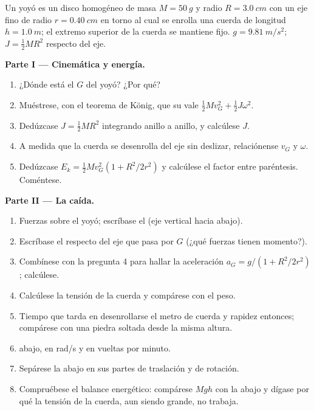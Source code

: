 \begin{problem}
\label{pb:b1:systems-of-points:1}
Un yoyó es un disco homogéneo de masa $M = \qty{50}{g}$ y radio $R =
\qty{3.0}{cm}$ con un eje fino de radio $r = \qty{0.40}{cm}$ en torno al
cual se enrolla una cuerda de longitud $h = \qty{1.0}{m}$; el extremo
superior de la cuerda se mantiene fijo. $g = \qty{9.81}{m/s^2}$;
$J = \tfrac12 MR^2$ respecto del eje.

\medskip
\noindent\textbf{Parte I --- Cinemática y energía.}
\begin{enumerate}
  \item ¿Dónde está el  $G$ del yoyó? ¿Por qué?
  \item Muéstrese, con el teorema de König, que su  vale $\tfrac12
        Mv_G^2 + \tfrac12 J\omega^2$.
  \item Dedúzcase $J = \tfrac12 MR^2$ integrando anillo a anillo, y
        calcúlese $J$.
  \item A medida que la cuerda se desenrolla del eje sin deslizar,
        relaciónense $v_G$ y $\omega$.
  \item Dedúzcase $E_k = \tfrac12 Mv_G^2(1 + R^2/2r^2)$ y calcúlese el
        factor entre paréntesis. Coméntese.
\end{enumerate}

\medskip
\noindent\textbf{Parte II --- La caída.}
\begin{enumerate}[resume]
  \item Fuerzas sobre el yoyó; escríbase el 
        (eje vertical hacia abajo).
  \item Escríbase el  respecto del eje que pasa
        por $G$ (¿qué fuerzas tienen momento?).
  \item Combínese con la pregunta 4 para hallar la aceleración $a_G = g/(1 +
        R^2/2r^2)$; calcúlese.
  \item Calcúlese la tensión de la cuerda y compárese con el peso.
  \item Tiempo que tarda en desenrollarse el metro de cuerda y rapidez
        entonces; compárese con una piedra soltada desde la misma altura.
  \item {} abajo, en rad/s y en vueltas por minuto.
  \item Sepárese la  abajo en sus partes de traslación y
        de rotación.
  \item Compruébese el balance energético: compárese $Mgh$ con la  abajo y dígase por qué la tensión de la cuerda, aun siendo
        grande, no trabaja.
\end{enumerate}


\end{problem}
